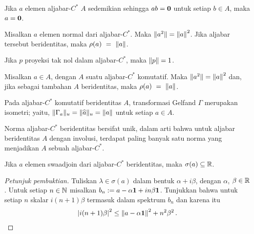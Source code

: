 \begin{cor}\label{001311008} Jika $a$ elemen aljabar-$C^*$ $A$ sedemikian sehingga
$ab = \mathbf{0}$ untuk setiap $b \in A$, maka $a = \mathbf{0}$.
\end{cor}

\begin{prop}\label{00131101} Misalkan $a$ elemen normal dari aljabar-$C^*$.
Maka $\lVert a^2\rVert = {\lVert a\rVert}^2$. Jika aljabar tersebut beridentitas, maka $\rho(a)~=~\lVert a\rVert$.
\end{prop}

\begin{cor} Jika $p$ proyeksi tak nol dalam aljabar-$C^*$, maka $\lVert p\rVert = 1$.
\end{cor}

\begin{cor}\label{00131102} Misalkan $a \in A$, dengan $A$ suatu aljabar-$C^*$ komutatif. Maka
$\lVert a^2\rVert = {\lVert a\rVert}^2$ dan, jika sebagai tambahan $A$ beridentitas, maka $\rho(a)~=~\lVert a\rVert$.
\end{cor}

\begin{cor}\label{00131103} Pada aljabar-$C^*$ komutatif beridentitas $A$, transformasi Gelfand
$\Gamma$ merupakan isometri; yaitu, $\lVert\Gamma_a\rVert_u = \lVert\widehat{a}\rVert_u = \lVert a\rVert$ untuk
setiap $a \in A$.
\end{cor}

\begin{cor}\label{00131104} Norma aljabar-$C^*$ beridentitas bersifat unik, dalam arti bahwa
untuk aljabar beridentitas $A$ dengan involusi, terdapat paling banyak satu norma yang menjadikan
$A$ sebuah aljabar-$C^*$.
\end{cor}

\begin{prop}\label{001312} Jika $a$ elemen swaadjoin dari aljabar-$C^*$ beridentitas,
maka $\sigma(a) \subseteq \mathbb{R}$.
\end{prop}

\begin{proof}[\emph{Petunjuk pembuktian}] Tuliskan $\lambda \in \sigma(a)$ dalam bentuk $\alpha + i\beta$, dengan $\alpha$, $\beta \in \mathbb{R}$.
Untuk setiap $n \in \mathbb{N}$ misalkan $b_n := a - \alpha \mathbf{1} + i n\beta\mathbf{1}$. Tunjukkan bahwa untuk setiap $n$ skalar
$i(n+1)\beta$ termasuk dalam spektrum $b_n$ dan karena itu
   \[ {\lvert i(n+1)\beta\rvert}^2 \le {\lVert a - \alpha\mathbf{1}\rVert}^2 + n^2\beta^2\,. \]   \ns
\end{proof}

